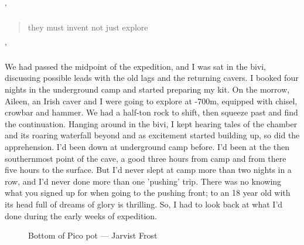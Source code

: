 '\begin{quote} they must invent not just explore\end{quote}'

We had passed the midpoint of the expedition, and I was sat in the bivi, discussing possible leads with the old lags and the returning cavers. I booked four nights in the underground camp and started preparing my kit. On the morrow, Aileen, an Irish caver and I were going to explore at -700m, equipped with chisel, crowbar and hammer. We had a half-ton rock to shift, then squeeze past and find the continuation. Hanging around in the bivi, I kept hearing tales of the chamber and its roaring waterfall beyond and as excitement started building up, so did the apprehension. I'd been down at underground camp before. I'd been at the then southernmost point of the cave, a good three hours from camp and from there five hours to the surface. But I'd never slept at camp  more than two nights in a row, and I'd never done more than one 'pushing' trip. 
There was no knowing what you signed up for when going to the pushing front; to an 18 year old with its head full of dreams of glory is thrilling. So, I had to look back at what I'd done during the early weeks of expedition.
\begin{figure}[t!]
\checkoddpage \ifoddpage \forcerectofloat \else \forceversofloat \fi
\centering
{}
\caption{Bottom of Pico pot --- Jarvist Frost}
\label{Pico}
\end{figure}



